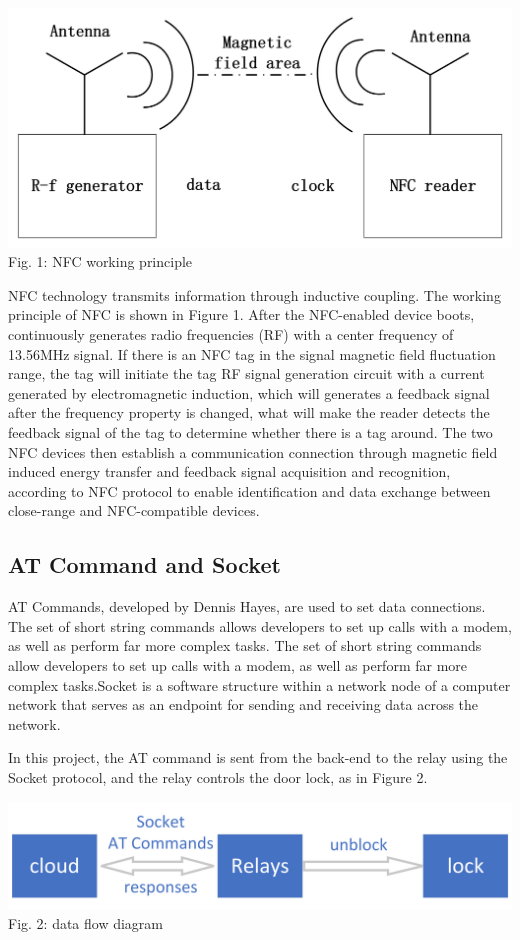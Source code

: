 \documentclass[11pt, a4paper]{article}
\begin{document}
\begin{center}
\includegraphics[scale=0.4]{pic1.png}
\\
Fig. 1: NFC working principle
\end{center}

NFC technology transmits information through inductive coupling. The working principle of NFC is shown in Figure 1. After the NFC-enabled device boots, continuously generates radio frequencies (RF) with a center frequency of 13.56MHz signal. If there is an NFC tag in the signal magnetic field fluctuation range, the tag will initiate the tag RF signal generation circuit with a current generated by electromagnetic induction, which will generates a feedback signal after the frequency property is changed, what will make the   reader detects the feedback signal of the tag to determine whether there is a tag around. The two NFC devices then establish a communication connection through magnetic field induced energy transfer and feedback signal acquisition and recognition, according to NFC protocol to enable identification and data exchange between close-range and NFC-compatible devices.

\subsection{AT Command and Socket}
AT Commands, developed by Dennis Hayes, are used to set data connections. The set of short string commands allows developers to set up calls with a modem, as well as perform far more complex tasks. The set of short string commands allow developers to set up calls with a modem, as well as perform far more complex tasks.Socket is a software structure within a network node of a computer network that serves as an endpoint for sending and receiving data across the network.

In this project, the AT command is sent from the back-end to the relay using the Socket protocol, and the relay controls the door lock, as in Figure 2.
\begin{center}
\includegraphics[scale=0.2]{pic2.png}
\\
Fig. 2: data flow diagram
\end{center}
\end{document}
